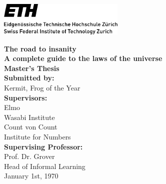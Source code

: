 \documentclass[11pt]{article}
\begin{document}
\begin{titlepage}
\includegraphics[width=6cm]{latex/extra/ETH_logo}
\begin{center}
    \vspace{3cm}
    \Huge
    \textbf{The road to insanity}\\
    \large
    \textbf{A complete guide to the laws of the universe}\\
    \vspace{2cm}
    \LARGE
    \textbf{Master's Thesis}\\
    \vspace{1cm}
    \large
    \textbf{Submitted by:}\\
    \vspace{0.2cm}
    Kermit, Frog of the Year\\
    \vspace{2cm}
    \large
    \textbf{Supervisors:}\\
    \vspace{0.2cm}
    Elmo\\
    Wasabi Institute\\
    \vspace{0.4cm}
    Count von Count\\
    Institute for Numbers\\
    \vspace{2cm}
    \textbf{Supervising Professor:}\\
    \vspace{0.2cm}
    Prof. Dr. Grover\\
    Head of Informal Learning\\
    \vspace{2cm}
    \large
    January 1st, 1970
\end{center}
\end{titlepage}
\end{document}
